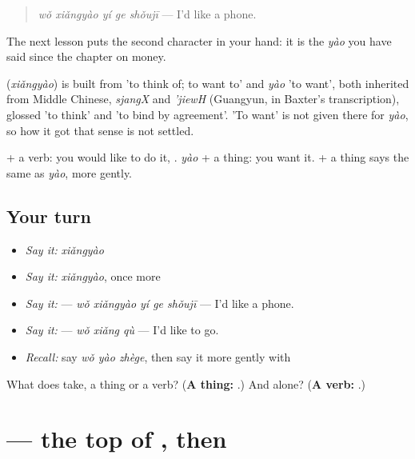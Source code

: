 \begin{quote}
\textbf{} \emph{wǒ xiǎngyào yí ge shǒujī} — I'd like a phone.
\end{quote}

The next lesson puts the second character in your hand: it is the \emph{yào} you have said since the chapter on money.

\begin{cousinweb}
\textbf{} (\emph{xiǎngyào}) is built from  'to think of; to want to' and \emph{yào} 'to want', both inherited from Middle Chinese, \emph{sjangX} and \emph{'jiewH} (Guangyun, in Baxter's transcription), glossed 'to think' and 'to bind by agreement'. 'To want' is not given there for \emph{yào}, so how it got that sense is not settled.
\end{cousinweb}

\begin{grammarlens}[title={What you've built}]
 + a verb: you would like to do it, . \emph{yào} + a thing: you want it.  + a thing says the same as \emph{yào}, more gently.
\end{grammarlens}

\subsection*{Your turn}
\begin{itemize}
\raggedright
  \item \emph{Say it:} \emph{xiǎngyào}
  \item \emph{Say it:} \emph{xiǎngyào}, once more
  \item \emph{Say it:}  — \emph{wǒ xiǎngyào yí ge shǒujī} — I'd like a phone.
  \item \emph{Say it:}  — \emph{wǒ xiǎng qù} — I'd like to go.
  \item \emph{Recall:} say \emph{wǒ yào zhège}, then say it more gently with 
\end{itemize}

\begin{tcolorbox}[breakable,colback=teal!4,colframe=teal!35!black,title={Before you move on}]
What does  take, a thing or a verb? (\textbf{A thing: }.) And  alone? (\textbf{A verb: }.)
\end{tcolorbox}
\section[\texorpdfstring{\zh{要} (yào)}{要 (yào)}]{ — the top of , then }

